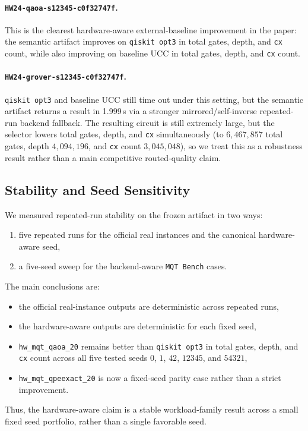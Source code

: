 \paragraph{\texttt{HW24-qaoa-s12345-c0f32747f}.}
This is the clearest hardware-aware external-baseline improvement in the paper:
the semantic artifact improves on \texttt{qiskit opt3} in total gates, depth,
and \texttt{cx} count, while also improving on baseline UCC in total gates,
depth, and \texttt{cx} count.

\paragraph{\texttt{HW24-grover-s12345-c0f32747f}.}
\texttt{qiskit opt3} and baseline UCC still time out under this setting,
but the semantic artifact returns a result in 1.999\,s via a stronger
mirrored/self-inverse repeated-run backend fallback. The resulting circuit is
still extremely large, but the selector lowers total gates, depth, and
\texttt{cx} simultaneously (to $6{,}467{,}857$ total gates, depth
$4{,}094{,}196$, and \texttt{cx} count $3{,}045{,}048$), so we treat this as a
robustness result rather than a main competitive routed-quality claim.


\subsection{Stability and Seed Sensitivity}

We measured repeated-run stability on the frozen artifact in two ways:
\begin{enumerate}[leftmargin=1.5em]
    \item five repeated runs for the official real instances and the canonical hardware-aware seed,
    \item a five-seed sweep for the backend-aware \texttt{MQT Bench} cases.
\end{enumerate}

The main conclusions are:
\begin{itemize}[leftmargin=1.5em]
    \item the official real-instance outputs are deterministic across repeated runs,
    \item the hardware-aware outputs are deterministic for each fixed seed,
    \item \texttt{hw\_mqt\_qaoa\_20} remains better than \texttt{qiskit opt3} in total gates, depth, and \texttt{cx} count across all five tested seeds $0$, $1$, $42$, $12345$, and $54321$,
    \item \texttt{hw\_mqt\_qpeexact\_20} is now a fixed-seed parity case rather than a strict improvement.
\end{itemize}
Thus, the hardware-aware claim is a stable workload-family result across a small
fixed seed portfolio, rather than a single favorable seed.


